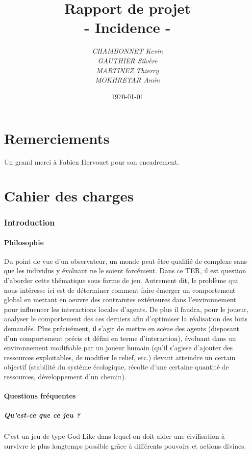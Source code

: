 \documentclass[a4paper]{article}
\title{\textbf{Rapport de projet}\\- \Huge{Incidence} -}
\author{\emph{CHAMBONNET Kevin}\\\emph{GAUTHIER Silvère}\\\emph{MARTINEZ Thierry}\\\emph{MOKHRETAR Amin}}
\date{\today}
\newcommand{\alinea}{\hspace*{0.5cm}}
\begin{document}
  \maketitle
  \newpage
  \tableofcontents
  
  \newpage
  \part{Remerciements}
  		
	Un grand merci à Fabien Hervouet pour son encadrement.
		
  \newpage
  \part{Cahier des charges}
  
    \section{Introduction}
      \subsection{Philosophie}
        \alinea Du point de vue d’un observateur, un monde peut être qualifié de complexe sans que les individus y évoluant ne le soient forcément. Dans ce TER, il est question d’aborder cette thématique sous forme de jeu. Autrement dit, le problème qui nous intéresse ici est de déterminer comment faire émerger un comportement global en mettant en oeuvre des contraintes extérieures dans l’environnement pour influencer les interactions locales d’agents. De plus il faudra, pour le joueur, analyser le comportement des ces derniers afin d’optimiser la réalisation des buts demandés. Plus précisément, il s’agit de mettre en scène des agents (disposant d’un comportement précis et défini en terme d’interaction), évoluant dans un environnement modifiable par un joueur humain (qu’il s’agisse d’ajouter des ressources exploitables, de modifier le relief, etc.) devant atteindre un certain objectif (stabilité du système écologique, récolte d’une certaine quantité de ressources, développement d’un chemin).

      \subsection{Questions fréquentes}
        \subsubsection{Qu'est-ce que ce jeu ?}
          \alinea C'est un jeu de type God-Like dans lequel on doit aider une civilisation à survivre le plus longtemps possible grâce à différents pouvoirs et actions divines.
			
\end{document}
